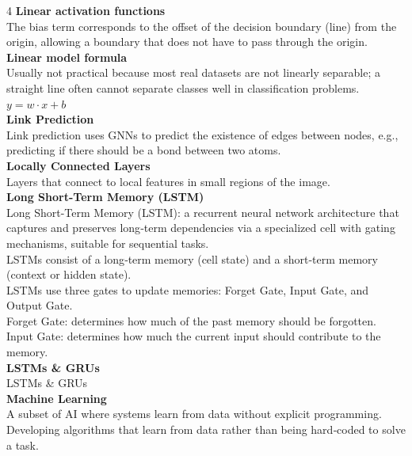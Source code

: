 \documentclass[8pt]{extarticle}
\begin{document}
\begin{multicols}{4}
\vspace{2pt}\textbf{Linear activation functions}\\
The bias term corresponds to the offset of the decision boundary (line) from the origin, allowing a boundary that does not have to pass through the origin.\\
\vspace{2pt}\textbf{Linear model formula}\\
Usually not practical because most real datasets are not linearly separable; a straight line often cannot separate classes well in classification problems.\\
$y = w\cdot x + b$\\
\vspace{2pt}\textbf{Link Prediction}\\
Link prediction uses GNNs to predict the existence of edges between nodes, e.g., predicting if there should be a bond between two atoms.\\
\vspace{2pt}\textbf{Locally Connected Layers}\\
Layers that connect to local features in small regions of the image.\\
\vspace{2pt}\textbf{Long Short-Term Memory (LSTM)}\\
Long Short-Term Memory (LSTM): a recurrent neural network architecture that captures and preserves long‑term dependencies via a specialized cell with gating mechanisms, suitable for sequential tasks.\\
LSTMs consist of a long‑term memory (cell state) and a short‑term memory (context or hidden state).\\
LSTMs use three gates to update memories: Forget Gate, Input Gate, and Output Gate.\\
Forget Gate: determines how much of the past memory should be forgotten.\\
Input Gate: determines how much the current input should contribute to the memory.\\
\vspace{2pt}\textbf{LSTMs \& GRUs}\\
LSTMs \& GRUs\\
\vspace{2pt}\textbf{Machine Learning}\\
A subset of AI where systems learn from data without explicit programming.\\
Developing algorithms that learn from data rather than being hard‑coded to solve a task.\\

\end{multicols}
\end{document}
